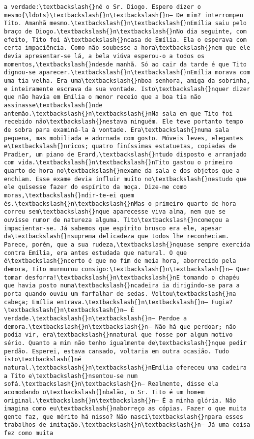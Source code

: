 \documentclass[11pt]{article}
\begin{document}
\begin{Verbatim}[commandchars=\\\{\}]
a verdade:\textbackslash{}né o Sr. Diogo. Espero dizer o mesmo{\ldots}\textbackslash{}n\textbackslash{}n— De mim? interrompeu Tito. Amanhã mesmo.\textbackslash{}n\textbackslash{}nEmília saiu pelo braço de Diogo.\textbackslash{}n\textbackslash{}nNo dia seguinte, com efeito, Tito foi à\textbackslash{}ncasa de Emília. Ela o esperava com certa impaciência. Como não soubesse a hora\textbackslash{}nem que ele devia apresentar-se lá, a bela viúva esperou-o a todos os momentos,\textbackslash{}ndesde manhã. Só ao cair da tarde é que Tito dignou-se aparecer.\textbackslash{}n\textbackslash{}nEmília morava com uma tia velha. Era uma\textbackslash{}nboa senhora, amiga da sobrinha, e inteiramente escrava da sua vontade. Isto\textbackslash{}nquer dizer que não havia em Emília o menor receio que a boa tia não assinasse\textbackslash{}nde antemão.\textbackslash{}n\textbackslash{}nNa sala em que Tito foi recebido não\textbackslash{}nestava ninguém. Ele teve portanto tempo de sobra para examiná-la à vontade. Era\textbackslash{}numa sala pequena, mas mobiliada e adornada com gosto. Móveis leves, elegantes e\textbackslash{}nricos; quatro finíssimas estatuetas, copiadas de Pradier, um piano de Erard,\textbackslash{}ntudo disposto e arranjado com vida.\textbackslash{}n\textbackslash{}nTito gastou o primeiro quarto de hora no\textbackslash{}nexame da sala e dos objetos que a enchiam. Esse exame devia influir muito no\textbackslash{}nestudo que ele quisesse fazer do espírito da moça. Dize-me como moras,\textbackslash{}ndir-te-ei quem és.\textbackslash{}n\textbackslash{}nMas o primeiro quarto de hora correu sem\textbackslash{}nque aparecesse viva alma, nem que se ouvisse rumor de natureza alguma. Tito\textbackslash{}ncomeçou a impacientar-se. Já sabemos que espírito brusco era ele, apesar da\textbackslash{}nsuprema delicadeza que todos lhe reconheciam. Parece, porém, que a sua rudeza,\textbackslash{}nquase sempre exercida contra Emília, era antes estudada que natural. O que é\textbackslash{}ncerto é que no fim de meia hora, aborrecido pela demora, Tito murmurou consigo:\textbackslash{}n\textbackslash{}n— Quer tomar desforra!\textbackslash{}n\textbackslash{}nE tomando o chapéu que havia posto numa\textbackslash{}ncadeira ia dirigindo-se para a porta quando ouviu um farfalhar de sedas. Voltou\textbackslash{}na cabeça; Emília entrava.\textbackslash{}n\textbackslash{}n— Fugia?\textbackslash{}n\textbackslash{}n— É verdade.\textbackslash{}n\textbackslash{}n— Perdoe a demora.\textbackslash{}n\textbackslash{}n— Não há que perdoar; não podia vir, era\textbackslash{}nnatural que fosse por algum motivo sério. Quanto a mim não tenho igualmente de\textbackslash{}nque pedir perdão. Esperei, estava cansado, voltaria em outra ocasião. Tudo isto\textbackslash{}né natural.\textbackslash{}n\textbackslash{}nEmília ofereceu uma cadeira a Tito e\textbackslash{}nsentou-se num sofá.\textbackslash{}n\textbackslash{}n— Realmente, disse ela acomodando o\textbackslash{}nbalão, o Sr. Tito é um homem original.\textbackslash{}n\textbackslash{}n— É a minha glória. Não imagina como eu\textbackslash{}naborreço as cópias. Fazer o que muita gente faz, que mérito há nisso? Não nasci\textbackslash{}npara esses trabalhos de imitação.\textbackslash{}n\textbackslash{}n— Já uma coisa fez como muita 
\end{Verbatim}
\end{document}
